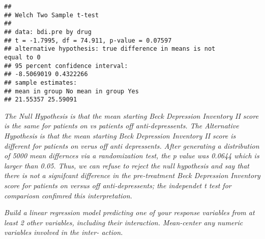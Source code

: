 \documentclass[
]{article}
\newenvironment{Shaded}{\begin{snugshade}}{\end{snugshade}}
\newcommand{\DataTypeTok}[1]{\textcolor[rgb]{0.13,0.29,0.53}{#1}}
\newcommand{\FloatTok}[1]{\textcolor[rgb]{0.00,0.00,0.81}{#1}}
\newcommand{\KeywordTok}[1]{\textcolor[rgb]{0.13,0.29,0.53}{\textbf{#1}}}
\newcommand{\NormalTok}[1]{#1}
\newcommand{\OperatorTok}[1]{\textcolor[rgb]{0.81,0.36,0.00}{\textbf{#1}}}
\newcommand{\OtherTok}[1]{\textcolor[rgb]{0.56,0.35,0.01}{#1}}
\newcommand{\StringTok}[1]{\textcolor[rgb]{0.31,0.60,0.02}{#1}}
\begin{document}
\begin{verbatim}
##
## Welch Two Sample t-test
##
## data: bdi.pre by drug
## t = -1.7995, df = 74.911, p-value = 0.07597
## alternative hypothesis: true difference in means is not
equal to 0
## 95 percent confidence interval:
## -8.5069019 0.4322266
## sample estimates:
## mean in group No mean in group Yes
## 21.55357 25.59091
\end{verbatim}

\emph{The Null Hypothesis is that the mean starting Beck Depression
Inventory II score is the same for patients on vs patients off
anti-depressents. The Alternative Hypothesis is that the mean starting
Beck Depression Inventory II score is different for patients on verus
off anti depressents. After generating a distribution of 5000 mean
differnces via a randomization test, the p value was 0.0644 which is
larger than 0.05. Thus, we can refuse to reject the null hypothesis and
say that there is not a signifcant difference in the pre-treatment Beck
Depression Inventory score for patients on versus off anti-depressents;
the independet t test for compariosn confimred this interpretation.}

\emph{Build a linear regression model predicting one of your response
variables from at least 2 other variables, including their interaction.
Mean-center any numeric variables involved in the inter- action.}

\begin{Shaded}
\end{Shaded}
\end{document}
